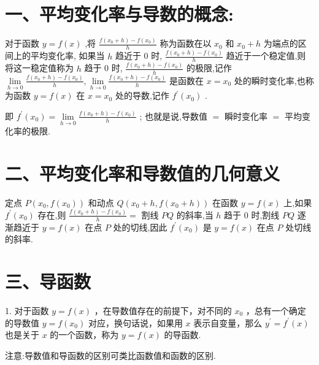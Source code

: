 \section*{一、平均变化率与导数的概念:}

对于函数 $y = f\left( x\right)$ ,将 $\frac{f\left( {{x}_{0} + h}\right)  - f\left( {x}_{0}\right) }{h}$ 称为函数在以 ${x}_{0}$ 和 ${x}_{0} + h$ 为端点的区间上的平均变化率, 如果当 $h$ 趋近于 0 时, $\frac{f\left( {{x}_{0} + h}\right)  - f\left( {x}_{0}\right) }{h}$ 趋近于一个稳定值,则将这一稳定值称为 $h$ 趋于 0 时, $\frac{f\left( {{x}_{0} + h}\right)  - f\left( {x}_{0}\right) }{h}$ 的极限,记作 $\mathop{\lim }\limits_{{h \rightarrow  0}}\frac{f\left( {{x}_{0} + h}\right)  - f\left( {x}_{0}\right) }{h},\mathop{\lim }\limits_{{h \rightarrow  0}}\frac{f\left( {{x}_{0} + h}\right)  - f\left( {x}_{0}\right) }{h}$ 是函数在 $x = {x}_{0}$ 处的瞬时变化率,也称为函数 $y = f\left( x\right)$ 在 $x = {x}_{0}$ 处的导数,记作 ${f}^{\prime }\left( {x}_{0}\right)$ .

即 ${f}^{\prime }\left( {x}_{0}\right)  = \mathop{\lim }\limits_{{h \rightarrow  0}}\frac{f\left( {{x}_{0} + h}\right)  - f\left( {x}_{0}\right) }{h}$ ; 也就是说,导数值 $=$ 瞬时变化率 $=$ 平均变化率的极限.

\section*{二、平均变化率和导数值的几何意义}

定点 $P\left( {{x}_{0},f\left( {x}_{0}\right) }\right)$ 和动点 $Q\left( {{x}_{0} + h,f\left( {{x}_{0} + h}\right) }\right)$ 在函数 $y = f\left( x\right)$ 上,如果 ${f}^{\prime }\left( {x}_{0}\right)$ 存在,则 $\frac{f\left( {{x}_{0} + h}\right)  - f\left( {x}_{0}\right) }{h} =$ 割线 ${PQ}$ 的斜率,当 $h$ 趋于 0 时,割线 ${PQ}$ 逐渐趋近于 $y = f\left( x\right)$ 在点 $P$ 处的切线,因此 ${f}^{\prime }\left( {x}_{0}\right)$ 是 $y = f\left( x\right)$ 在点 $P$ 处切线的斜率.

\section*{三、导函数}

1. 对于函数 $y = f\left( x\right)$ ，在导数值存在的前提下，对不同的 ${x}_{0}$ ，总有一个确定的导数值 $y = f\left( {x}_{0}\right)$ 对应，换句话说，如果用 $x$ 表示自变量，那么 ${y}^{\prime } = {f}^{\prime }\left( x\right)$ 也是关于 $x$ 的一个函数，称为 $y = f\left( x\right)$ 的导函数.

注意:导数值和导函数的区别可类比函数值和函数的区别.

